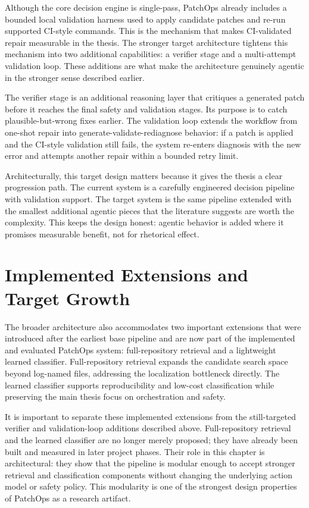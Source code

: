 Although the core decision engine is single-pass, PatchOps already includes a bounded local validation harness
used to apply candidate patches and re-run supported CI-style commands. This is the mechanism that makes
CI-validated repair measurable in the thesis. The stronger target architecture tightens this mechanism into two
additional capabilities: a verifier stage and a multi-attempt validation loop. These additions are what make the
architecture genuinely agentic in the stronger sense described earlier.

The verifier stage is an additional reasoning layer that critiques a generated patch before it reaches the final
safety and validation stages. Its purpose is to catch plausible-but-wrong fixes earlier. The validation loop
extends the workflow from one-shot repair into generate-validate-rediagnose behavior: if a patch is applied and
the CI-style validation still fails, the system re-enters diagnosis with the new error and attempts another
repair within a bounded retry limit.

Architecturally, this target design matters because it gives the thesis a clear progression path. The current
system is a carefully engineered decision pipeline with validation support. The target system is the same
pipeline extended with the smallest additional agentic pieces that the literature suggests are worth the
complexity. This keeps the design honest: agentic behavior is added where it promises measurable benefit, not
for rhetorical effect.

\section{Implemented Extensions and Target Growth}

The broader architecture also accommodates two important extensions that were introduced after the earliest base
pipeline and are now part of the implemented and evaluated PatchOps system: full-repository retrieval and a
lightweight learned classifier. Full-repository retrieval expands the candidate search space beyond log-named
files, addressing the localization bottleneck directly. The learned classifier supports reproducibility and
low-cost classification while preserving the main thesis focus on orchestration and safety.

It is important to separate these implemented extensions from the still-targeted verifier and validation-loop
additions described above. Full-repository retrieval and the learned classifier are no longer merely proposed;
they have already been built and measured in later project phases. Their role in this chapter is architectural:
they show that the pipeline is modular enough to accept stronger retrieval and classification components without
changing the underlying action model or safety policy. This modularity is one of the strongest design
properties of PatchOps as a research artifact.

